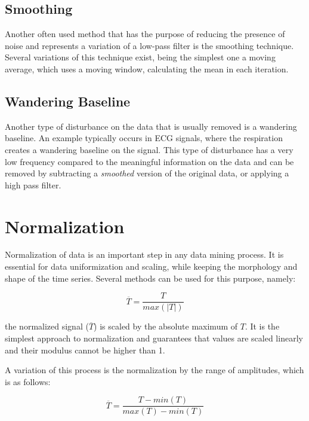\subsection{Smoothing}
\label{subsec:smooth}

Another often used method that has the purpose of reducing the presence of noise and represents a variation of a low-pass filter is the smoothing technique. Several variations of this technique exist, being the simplest one a moving average, which uses a moving window, calculating the mean in each iteration.

\subsection{Wandering Baseline}
\label{subsec:w_baseline}

Another type of disturbance on the data that is usually removed is a wandering baseline. An example typically occurs in ECG signals, where the respiration creates a wandering baseline on the signal. This type of disturbance has a very low frequency compared to the meaningful information on the data and can be removed by subtracting a \textit{smoothed} version of the original data, or applying a high pass filter.

\section{Normalization} 
\label{sec:normalize}

Normalization of data is an important step in any data mining process. It is essential for data uniformization and scaling, while keeping the morphology and shape of the time series. Several methods can be used for this purpose, namely:

\begin{equation}
\overline{T} = \frac{T}{max(|T|)}
\end{equation}

the normalized signal ($\overline{T}$) is scaled by the absolute maximum of $T$. It is the simplest approach to normalization and guarantees that values are scaled linearly and their modulus cannot be higher than 1.
\par
A variation of this process is the normalization by the range of amplitudes, which is as follows:

\begin{equation}
\overline{T} = \frac{T-min(T)}{max(T)-min(T)}
\end{equation}

